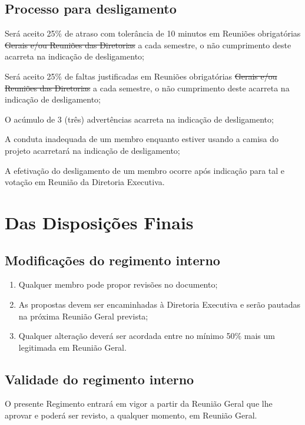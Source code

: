     \subsection{Processo para desligamento}
    \begin{enumerate}
        \item Será aceito 25$\%$ de atraso com tolerância de 10 minutos em Reuniões {\color{red}obrigatórias} {\color{cyan}\sout {Gerais e/ou Reuniões das Diretorias}} a cada semestre, o não cumprimento deste acarreta na indicação de desligamento;
        \item Será aceito 25$\%$ de faltas justificadas em Reuniões {\color{red}obrigatórias} {\color{cyan}\sout {Gerais e/ou Reuniões das Diretorias}} a cada semestre, o não cumprimento deste acarreta na indicação de desligamento;
        \item O acúmulo de 3 (três) advertências acarreta na indicação de desligamento;
        {\color{red} 
        \item A conduta inadequada de um membro enquanto estiver usando a camisa do projeto acarretará na indicação de desligamento;
        }
        \item A efetivação do desligamento de um membro ocorre após indicação para tal e votação em Reunião da Diretoria Executiva.
    \end{enumerate}

\section{Das Disposições Finais}
    \subsection{Modificações do regimento interno}
        \begin{enumerate}
            \item Qualquer membro pode propor revisões no documento;
            \item As propostas devem ser encaminhadas à Diretoria Executiva e serão pautadas na próxima Reunião Geral prevista;
            \item Qualquer alteração deverá ser acordada entre no mínimo 50$\%$ mais um legitimada em Reunião Geral.
        \end{enumerate}
    \subsection{Validade do regimento interno}
        O presente Regimento entrará em vigor a partir da Reunião Geral que lhe aprovar e poderá ser revisto, a qualquer momento, em Reunião Geral.
